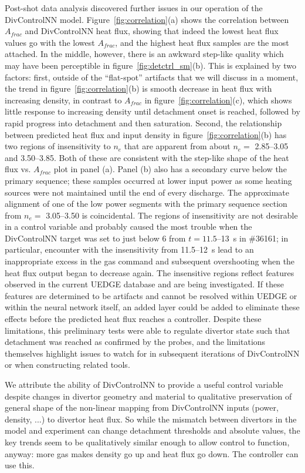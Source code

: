 \documentclass[10pt]{iopart}
\begin{document}
Post-shot data analysis discovered further issues in our operation of the DivControlNN model.
Figure~\ref{fig:correlation}(a) shows the correlation between $A_{frac}$ and DivControlNN heat flux, showing that indeed the lowest heat flux values go with the lowest $A_{frac}$, and the highest heat flux samples are the most attached.
In the middle, however, there is an awkward step-like quality which may have been perceptible in figure~\ref{fig:detctrl_sm}(b).
This is explained by two factors:
first, outside of the ``flat-spot'' artifacts that we will discuss in a moment, the trend in figure~\ref{fig:correlation}(b) is smooth decrease in heat flux with increasing density, in contrast to $A_{frac}$ in figure~\ref{fig:correlation}(c), which shows little response to increasing density until detachment onset is reached, followed by rapid progress into detachment and then saturation.
Second, the relationship between predicted heat flux and input density in figure~\ref{fig:correlation}(b) has two regions of insensitivity to $n_e$ that are apparent from about $n_e=$ 2.85--3.05 and 3.50--3.85.
Both of these are consistent with the step-like shape of the heat flux vs. $A_{frac}$ plot in panel (a).
Panel (b) also has a secondary curve below the primary sequence; these samples occurred at lower input power as some heating sources were not maintained until the end of every discharge.
The approximate alignment of one of the low power segments with the primary sequence section from $n_e=$ 3.05--3.50 is coincidental.
The regions of insensitivity are not desirable in a control variable and probably caused the most trouble when the DivControlNN target was set to just below 6 from $t=11.5$--13~s in \#36161; in particular, encounter with the insensitivity from 11.5--12~s lead to an inappropriate excess in the gas command and subsequent overshooting when the heat flux output began to decrease again.
The insensitive regions reflect features observed in the current UEDGE database and are being investigated.
If these features are determined to be artifacts and cannot be resolved within UEDGE or within the neural network itself, an added layer could be added to eliminate these effects before the predicted heat flux reaches a controller.
Despite these limitations, this preliminary tests were able to regulate divertor state such that detachment was reached as confirmed by the probes, and the limitations themselves highlight issues to watch for in subsequent iterations of DivControlNN or when constructing related tools.

We attribute the ability of DivControlNN to provide a useful control variable despite changes in divertor geometry and material to qualitative preservation of general shape of the non-linear mapping from DivControlNN inputs (power, density, ...) to divertor heat flux.
So while the mismatch between divertors in the model and experiment can change detachment thresholds and absolute values, the key trends seem to be qualitatively similar enough to allow control to function, anyway: more gas makes density go up and heat flux go down.
The controller can use this.
\end{document}
